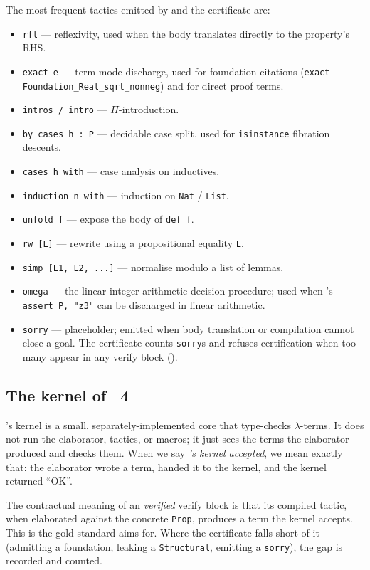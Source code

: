 The most-frequent \Lean{} tactics emitted by \PSDL{} and the
certificate are:
\begin{itemize}[leftmargin=1.7em]
  \item \verb|rfl| --- reflexivity, used when the body translates
    directly to the property's RHS.
  \item \verb|exact e| --- term-mode discharge, used for foundation
    citations (\verb|exact Foundation_Real_sqrt_nonneg|) and for
    direct proof terms.
  \item \verb|intros / intro| --- $\Pi$-introduction.
  \item \verb|by_cases h : P| --- decidable case split, used for
    \texttt{isinstance} fibration descents.
  \item \verb|cases h with| --- case analysis on inductives.
  \item \verb|induction n with| --- induction on \verb|Nat| /
    \verb|List|.
  \item \verb|unfold f| --- expose the body of \verb|def f|.
  \item \verb|rw [L]| --- rewrite using a propositional equality
    \verb|L|.
  \item \verb|simp [L1, L2, ...]| --- normalise modulo a list of
    lemmas.
  \item \verb|omega| --- the linear-integer-arithmetic decision
    procedure; used when \PSDL{}'s \verb|assert P, "z3"| can be
    discharged in linear arithmetic.
  \item \verb|sorry| --- placeholder; emitted when body translation
    or \PSDL{} compilation cannot close a goal.  The certificate
    counts \verb|sorry|s and refuses certification when too many
    appear in any verify block ().
\end{itemize}

\subsection{The kernel of \Lean~4}

\Lean's kernel is a small, separately-implemented core that
type-checks $\lambda$-terms.  It does not run the elaborator,
tactics, or macros; it just sees the terms the elaborator produced
and checks them.  When we say \emph{\Lean's kernel accepted},
we mean exactly that: the elaborator wrote a term, handed it to the
kernel, and the kernel returned ``OK''.

The contractual meaning of an \emph{verified} verify block is that
its compiled \Lean{} tactic, when elaborated against the concrete
\texttt{Prop}, produces a term the kernel accepts.  This is the
gold standard \Deppy{} aims for.  Where the certificate falls short
of it (admitting a foundation, leaking a \verb|Structural|, emitting
a \verb|sorry|), the gap is recorded and counted.

